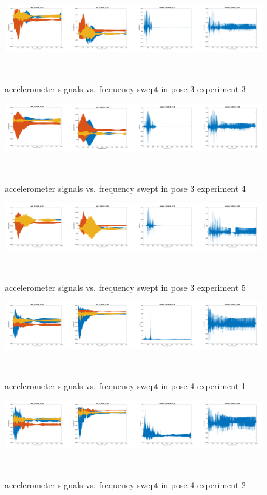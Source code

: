 \documentclass{sigchi}
\begin{document}
\begin{figure}
  \centering
  \includegraphics[width=1.95\columnwidth]{figures/pose3_3}
  \caption{accelerometer signals vs. frequency swept in pose 3 experiment 3}
    ~\label{fig:pose3_3}
\end{figure}

\begin{figure}
  \centering
  \includegraphics[width=1.95\columnwidth]{figures/pose3_4}
  \caption{accelerometer signals vs. frequency swept in pose 3 experiment 4}
    ~\label{fig:pose3_4}
\end{figure}

\begin{figure}
  \centering
  \includegraphics[width=1.95\columnwidth]{figures/pose3_5}
  \caption{accelerometer signals vs. frequency swept in pose 3 experiment 5}
    ~\label{fig:pose3_5}
\end{figure}

\begin{figure}
  \centering
  \includegraphics[width=1.95\columnwidth]{figures/pose4_1}
  \caption{accelerometer signals vs. frequency swept in pose 4 experiment 1}
    ~\label{fig:pose4_1}
\end{figure}

\begin{figure}
  \centering
  \includegraphics[width=1.95\columnwidth]{figures/pose4_2}
  \caption{accelerometer signals vs. frequency swept in pose 4 experiment 2}
    ~\label{fig:pose4_2}
\end{figure}
\end{document}
